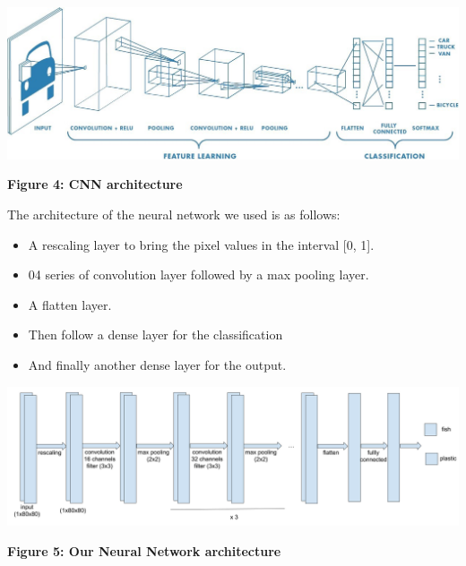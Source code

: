 \documentclass[a4paper, 12pt]{report}
\begin{document}
\begin{itemize}
\begin{center}
        \includegraphics[height = 0.36 \linewidth]{cnn_architecture.jpeg}


        \textbf{Figure 4: CNN architecture }\cite{cnn_architecture}

    \end{center}

    The architecture of the neural network we used is as follows:


    \begin{itemize}

        \item A rescaling layer to bring the pixel values in the interval [0, 1].

        \item 04 series of convolution layer followed by a max pooling layer.

        \item A flatten layer.

        \item Then follow a dense layer for the classification
        
        \item And finally another dense layer for the output.

    \end{itemize}

    \begin{center}

        \includegraphics[height = 0.36 \linewidth]{our_nn_architecture.png}


        \textbf{Figure 5: Our Neural Network architecture }

\end{center}

\end{itemize}
\end{document}
